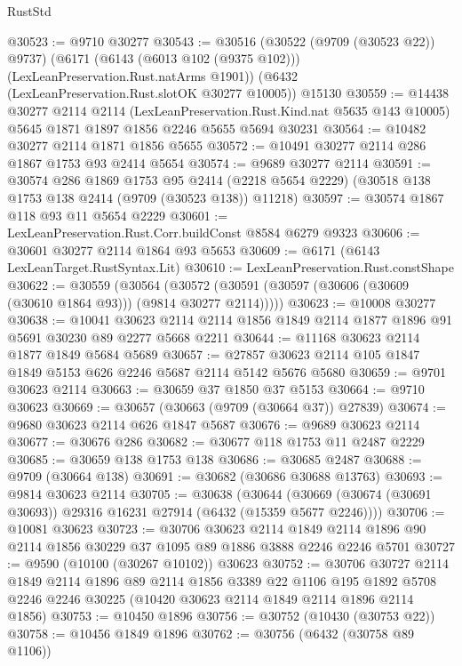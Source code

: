 \begin{lexlean}{RustStd}
\begin{coremodule}
@30523 := @9710 @30277
@30543 := @30516
    (@30522 (@9709 (@30523 @22)) @9737)
    (@6171 (@6143 (@6013 @102 (@9375 @102))) (LexLeanPreservation.Rust.natArms @1901))
    (@6432 (LexLeanPreservation.Rust.slotOK @30277 @10005))
    @15130
@30559 := @14438
    @30277
    @2114
    @2114
    (LexLeanPreservation.Rust.Kind.nat @5635 @143 @10005)
    @5645
    @1871
    @1897
    @1856
    @2246
    @5655
    @5694
    @30231
@30564 := @10482 @30277 @2114 @1871 @1856 @5655
@30572 := @10491 @30277 @2114 @286 @1867 @1753 @93 @2414 @5654
@30574 := @9689 @30277 @2114
@30591 := @30574
    @286
    @1869
    @1753
    @95
    @2414
    (@2218 @5654 @2229)
    (@30518 @138 @1753 @138 @2414 (@9709 (@30523 @138)) @11218)
@30597 := @30574 @1867 @118 @93 @11 @5654 @2229
@30601 := LexLeanPreservation.Rust.Corr.buildConst @8584 @6279 @9323
@30606 := @30601 @30277 @2114 @1864 @93 @5653
@30609 := @6171 (@6143 LexLeanTarget.RustSyntax.Lit)
@30610 := LexLeanPreservation.Rust.constShape
@30622 := @30559
    (@30564 (@30572 (@30591 (@30597 (@30606 (@30609 (@30610 @1864 @93))) (@9814 @30277 @2114)))))
@30623 := @10008 @30277
@30638 := @10041
    @30623
    @2114
    @2114
    @1856
    @1849
    @2114
    @1877
    @1896
    @91
    @5691
    @30230
    @89
    @2277
    @5668
    @2211
@30644 := @11168 @30623 @2114 @1877 @1849 @5684 @5689
@30657 := @27857 @30623 @2114 @105 @1847 @1849 @5153 @626 @2246 @5687 @2114 @5142 @5676 @5680
@30659 := @9701 @30623 @2114
@30663 := @30659 @37 @1850 @37 @5153
@30664 := @9710 @30623
@30669 := @30657 (@30663 (@9709 (@30664 @37)) @27839)
@30674 := @9680 @30623 @2114 @626 @1847 @5687
@30676 := @9689 @30623 @2114
@30677 := @30676 @286
@30682 := @30677 @118 @1753 @11 @2487 @2229
@30685 := @30659 @138 @1753 @138
@30686 := @30685 @2487
@30688 := @9709 (@30664 @138)
@30691 := @30682 (@30686 @30688 @13763)
@30693 := @9814 @30623 @2114
@30705 := @30638
    (@30644 (@30669 (@30674 (@30691 @30693)) @29316 @16231 @27914 (@6432 (@15359 @5677 @2246))))
@30706 := @10081 @30623
@30723 := @30706
    @30623
    @2114
    @1849
    @2114
    @1896
    @90
    @2114
    @1856
    @30229
    @37
    @1095
    @89
    @1886
    @3888
    @2246
    @2246
    @5701
@30727 := @9590 (@10100 (@30267 @10102)) @30623
@30752 := @30706
    @30727
    @2114
    @1849
    @2114
    @1896
    @89
    @2114
    @1856
    @3389
    @22
    @1106
    @195
    @1892
    @5708
    @2246
    @2246
    @30225
    (@10420 @30623 @2114 @1849 @2114 @1896 @2114 @1856)
@30753 := @10450 @1896
@30756 := @30752 (@10430 (@30753 @22))
@30758 := @10456 @1849 @1896
@30762 := @30756 (@6432 (@30758 @89 @1106))

\end{coremodule}
\end{lexlean}
